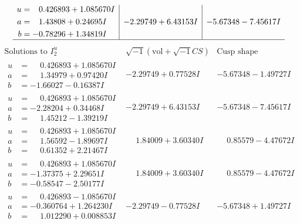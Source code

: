 \documentclass[1p]{elsarticle_modified}
\theoremstyle{definition}
\newcommand{\I}{\sqrt{-1}}
\begin{document}
$$\begin{array}{c|c|c}
\begin{aligned}
u &= \phantom{-}0.426893 + 1.085670 I \\
a &= \phantom{-}1.43808 + 0.24695 I \\
b &= -0.78296 + 1.34819 I\end{aligned}
 & -2.29749 + 6.43153 I & -5.67348 - 7.45617 I\\
 \hline 
 \end{array}$$\newpage$$\begin{array}{c|c|c}  
\text{Solutions to }I^u_{2}& \I (\text{vol} + \sqrt{-1}CS) & \text{Cusp shape}\\
 \hline 
\begin{aligned}
u &= \phantom{-}0.426893 + 1.085670 I \\
a &= \phantom{-}1.34979 + 0.97420 I \\
b &= -1.66027 - 0.16387 I\end{aligned}
 & -2.29749 + 0.77528 I & -5.67348 - 1.49727 I \\ \hline\begin{aligned}
u &= \phantom{-}0.426893 + 1.085670 I \\
a &= -2.28204 + 0.34468 I \\
b &= \phantom{-}1.45212 - 1.39219 I\end{aligned}
 & -2.29749 + 6.43153 I & -5.67348 - 7.45617 I \\ \hline\begin{aligned}
u &= \phantom{-}0.426893 + 1.085670 I \\
a &= \phantom{-}1.56592 - 1.89697 I \\
b &= \phantom{-}0.61352 + 2.21467 I\end{aligned}
 & \phantom{-}1.84009 + 3.60340 I & \phantom{-}0.85579 - 4.47672 I \\ \hline\begin{aligned}
u &= \phantom{-}0.426893 + 1.085670 I \\
a &= -1.37375 + 2.29651 I \\
b &= -0.58547 - 2.50177 I\end{aligned}
 & \phantom{-}1.84009 + 3.60340 I & \phantom{-}0.85579 - 4.47672 I \\ \hline\begin{aligned}
u &= \phantom{-}0.426893 - 1.085670 I \\
a &= -0.360764 + 1.264230 I \\
b &= \phantom{-}1.012290 + 0.008853 I\end{aligned}
 & -2.29749 - 0.77528 I & -5.67348 + 1.49727 I \\ \hline\begin{aligned}

\end{aligned}
\end{array}$$
\end{document}

